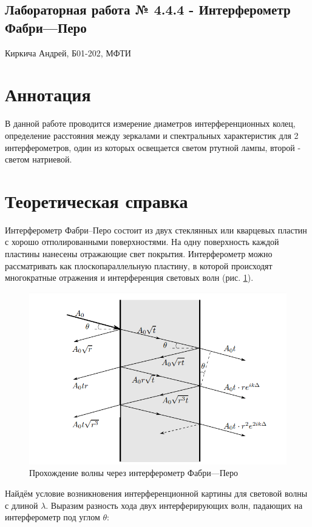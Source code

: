 \documentclass[12pt,a4paper]{extreport}
\begin{document}
\begin{center}
	\section*{\textbf{Лабораторная работа № 4.4.4 - Интерферометр Фабри---Перо}}
	
	\normalsize{Киркича Андрей, Б01-202, МФТИ}
	\\
\end{center}
\section{Аннотация}
В данной работе проводится измерение диаметров интерференционных колец, определение расстояния между зеркалами и спектральных характеристик для 2 интерферометров, один из которых освещается светом ртутной лампы, второй - светом натриевой.
	
\section{Теоретическая справка}

Интерферометр Фабри–Перо состоит из двух стеклянных или кварцевых пластин с хорошо отполированными поверхностями. На одну поверхность каждой пластины нанесены отражающие свет покрытия. Интерферометр можно рассматривать как плоскопараллельную пластину, в которой происходят многократные отражения и интерференция световых волн (рис. \ref{fig:reflections}). 

\begin{figure}[!h]
	\centering
	\includegraphics[width=0.8\linewidth]{Screenshot_1}
	\caption{Прохождение волны через интерферометр Фабри---Перо}
	\label{fig:reflections}
\end{figure}

Найдём условие возникновения интерференционной картины для световой волны с длиной $ \lambda $. Выразим разность хода двух интерферирующих волн, падающих на интерферометр под углом $ \theta $:
\end{document}
